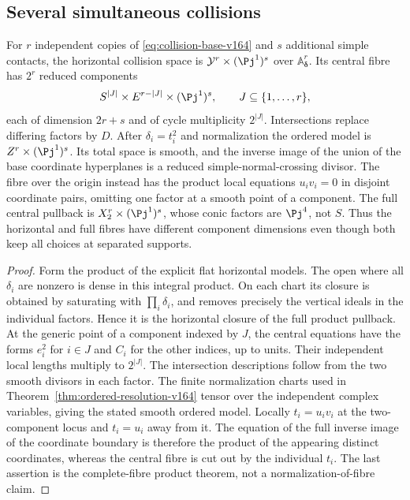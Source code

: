\subsection{Several simultaneous collisions}
\begin{corollary}
\label{cor:multiple-collisions-v164}
For $r$ independent copies of \eqref{eq:collision-base-v164} and
$s$ additional simple contacts, the horizontal collision space is
$\mathcal Y^r\times(\Pj^1)^s$ over $\mathbb A^r_{\boldsymbol\delta}$.
Its central fibre has $2^r$ reduced components
\[
 S^{|J|}\times E^{r-|J|}\times(\Pj^1)^s,
                   \qquad J\subseteq\{1,\ldots,r\},
\]
each of dimension $2r+s$ and of cycle multiplicity $2^{|J|}$.
Intersections replace differing factors by $D$.
After $\delta_i=t_i^2$ and normalization the ordered model is
$Z^r\times(\Pj^1)^s$. Its total space is smooth, and the inverse
image of the union of the base coordinate hyperplanes is a reduced
simple-normal-crossing divisor. The fibre over the origin instead
has the product local equations $u_iv_i=0$ in disjoint coordinate
pairs, omitting one factor at a smooth point of a component.
The full central pullback is $X_2^r\times(\Pj^1)^s$, whose conic
factors are $\Pj^4$, not $S$. Thus the horizontal and full fibres
have different component dimensions even though both keep all
choices at separated supports.
\end{corollary}
\begin{proof}
Form the product of the explicit flat horizontal models. The
open where all $\delta_i$ are nonzero is dense in this integral
product. On each chart its closure is obtained by saturating with
$\prod_i\delta_i$, and removes precisely the vertical ideals in
the individual factors. Hence it is the horizontal closure of the
full product pullback. At the generic point of a component indexed
by $J$, the central equations have the forms $e_i^2$ for $i\in J$
and $C_i$ for the other indices, up to units. Their independent
local lengths multiply to $2^{|J|}$. The intersection descriptions
follow from the two smooth divisors in each factor. The finite
normalization charts used in Theorem~\ref{thm:ordered-resolution-v164}
tensor over the independent complex variables, giving the stated
smooth ordered model. Locally $t_i=u_iv_i$ at the two-component
locus and $t_i=u_i$ away from it. The equation of the full inverse
image of the coordinate boundary is therefore the product of the
appearing distinct coordinates, whereas the central fibre is cut
out by the individual $t_i$. The last assertion is the complete-fibre
product theorem, not a normalization-of-fibre claim.
\end{proof}

